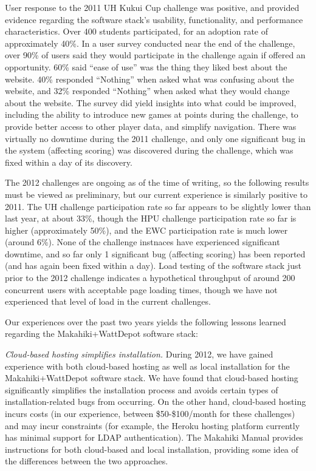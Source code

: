 User response to the 2011 UH Kukui Cup challenge was positive, and provided evidence regarding the software stack's usability, functionality, and performance characteristics.   Over 400 students participated, for an adoption rate of approximately 40\%.  In a user survey conducted near the end of the challenge, over 90\% of users said they would participate in the challenge again if offered an opportunity.  60\%  said ``ease of use'' was the thing they liked best about the website.  40\% responded ``Nothing'' when asked what was confusing about the website, and 32\% responded ``Nothing'' when asked what they would change about the website.  The survey did yield insights into what could be improved, including the ability to introduce new games at points during the challenge, to provide better access to other player data, and simplify navigation.  There was virtually no downtime during the 2011 challenge, and only one significant bug in the system (affecting scoring) was discovered during the challenge, which was fixed within a day of its discovery.

The 2012 challenges are ongoing as of the time of writing, so the following results must be viewed as preliminary, but our current experience is similarly positive to 2011.  The UH challenge participation rate so far appears to be slightly lower than last year, at about 33\%, though the HPU challenge participation rate so far is higher (approximately 50\%), and the EWC participation rate is much lower (around 6\%). None of the challenge instnaces have experienced significant downtime, and so far only 1 significant bug (affecting scoring) has been reported (and has again been fixed within a day).  Load testing of the software stack just prior to the 2012 challenge indicates a hypothetical throughput of around 200 concurrent users with acceptable page loading times, though we have not experienced that level of load in the current challenges. 

Our experiences over the past two years yields the following lessons learned regarding the Makahiki+WattDepot software stack:

{\em Cloud-based hosting simplifies installation.}  During 2012, we have gained experience with both cloud-based hosting as well as local installation for the Makahiki+WattDepot software stack.  We have found that cloud-based hosting significantly simplifies the installation process and avoids certain types of installation-related bugs from occurring.  On the other hand, cloud-based hosting incurs costs (in our experience, between \$50-\$100/month for these challenges) and may incur constraints (for example, the Heroku hosting platform currently has minimal support for LDAP authentication).  The Makahiki Manual \cite{MakahikiManual} provides instructions for both cloud-based and local installation, providing some idea of the differences between the two approaches.


